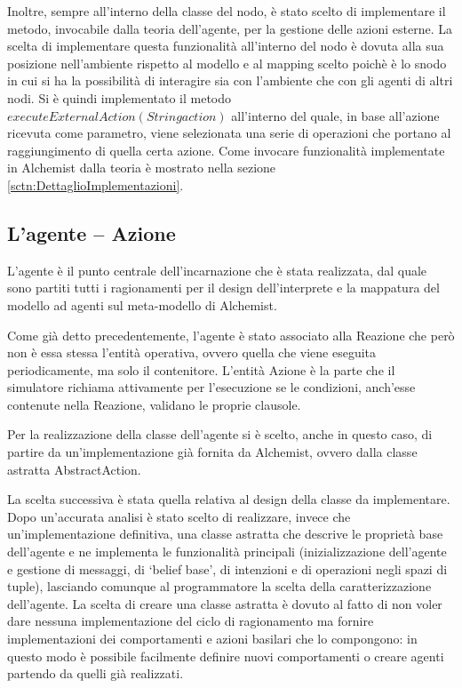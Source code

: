 Inoltre, sempre all'interno della classe del nodo, è stato scelto di implementare il metodo, invocabile dalla teoria dell'agente, per la gestione delle azioni esterne.
La scelta di implementare questa funzionalità all'interno del nodo è dovuta alla sua posizione nell'ambiente rispetto al modello e al mapping scelto poichè è lo snodo in cui si ha la possibilità di interagire sia con l'ambiente che con gli agenti di altri nodi. Si è quindi implementato il metodo $executeExternalAction(String action)$ all'interno del quale, in base all'azione ricevuta come parametro, viene selezionata una serie di operazioni che portano al raggiungimento di quella certa azione. Come invocare funzionalità implementate in Alchemist dalla teoria è mostrato nella sezione \ref{sctn:DettaglioImplementazioni}.

\subsection{L'agente -- Azione}\label{sctn:AbstractAgent}
L'agente è il punto centrale dell'incarnazione che è stata realizzata, dal quale sono partiti tutti i ragionamenti per il design dell'interprete e la mappatura del modello ad agenti sul meta-modello di Alchemist.

Come già detto precedentemente, l'agente è stato associato alla Reazione che però non è essa stessa l'entità operativa, ovvero quella che viene eseguita periodicamente, ma solo il contenitore. L'entità Azione è la parte che il simulatore richiama attivamente per l'esecuzione se le condizioni, anch'esse contenute nella Reazione, validano le proprie clausole.

Per la realizzazione della classe dell'agente si è scelto, anche in questo caso, di partire da un'implementazione già fornita da Alchemist, ovvero dalla classe astratta AbstractAction.

La scelta successiva è stata quella relativa al design della classe da implementare. Dopo un'accurata analisi è stato scelto di realizzare, invece che un'implementazione definitiva, una classe astratta che descrive le proprietà base dell'agente e ne implementa le funzionalità principali (inizializzazione dell'agente e gestione di messaggi, di `belief base', di intenzioni e di operazioni negli spazi di tuple), lasciando comunque al programmatore la scelta della caratterizzazione dell'agente. La scelta di creare una classe astratta è dovuto al fatto di non voler dare nessuna implementazione del ciclo di ragionamento ma fornire implementazioni dei comportamenti e azioni basilari che lo compongono: in questo modo è possibile facilmente definire nuovi comportamenti o creare agenti partendo da quelli già realizzati.

